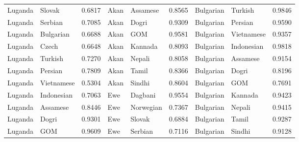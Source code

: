 \documentclass[11pt]{article} %
\begin{document}
\begin{table}
\begin{tabular}{llr@{\hspace{12pt}}llr@{\hspace{12pt}}llr}
            Luganda                      & Slovak              & 0.6817        & Akan                & Assamese            & 0.8565        & Bulgarian           & Turkish             & 0.9846        \\
            Luganda                      & Serbian             & 0.7085        & Akan                & Dogri               & 0.9309        & Bulgarian           & Persian             & 0.9590        \\
            Luganda                      & Bulgarian           & 0.6688        & Akan                & GOM                 & 0.9581        & Bulgarian           & Vietnamese          & 0.9357        \\
            Luganda                      & Czech               & 0.6648        & Akan                & Kannada             & 0.8093        & Bulgarian           & Indonesian          & 0.9818        \\
            Luganda                      & Turkish             & 0.7270        & Akan                & Nepali              & 0.8058        & Bulgarian           & Assamese            & 0.9154        \\
            Luganda                      & Persian             & 0.7809        & Akan                & Tamil               & 0.8366        & Bulgarian           & Dogri               & 0.8196        \\
            Luganda                      & Vietnamese          & 0.5304        & Akan                & Sindhi              & 0.8604        & Bulgarian           & GOM                 & 0.7691        \\
            Luganda                      & Indonesian          & 0.7063        & Ewe                 & Dagbani             & 0.9554        & Bulgarian           & Kannada             & 0.9423        \\
            Luganda                      & Assamese            & 0.8446        & Ewe                 & Norwegian           & 0.7367        & Bulgarian           & Nepali              & 0.9415        \\
            Luganda                      & Dogri               & 0.9301        & Ewe                 & Slovak              & 0.6884        & Bulgarian           & Tamil               & 0.9287        \\
            Luganda                      & GOM                 & 0.9609        & Ewe                 & Serbian             & 0.7116        & Bulgarian           & Sindhi              & 0.9128        \\

\end{tabular}
\end{table}
\end{document}
